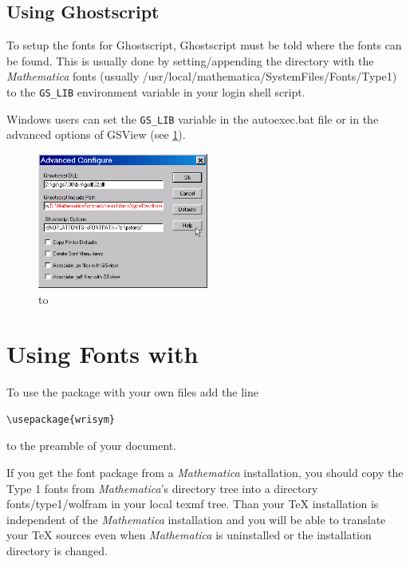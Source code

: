 \documentclass{article}
\newcommand{\Math}{\textit{Mathematica}\xspace}
\begin{document}
\subsection{Using Ghostscript}

To setup the fonts for Ghostscript, Ghostscript must be told where the
fonts can be found.  This is usually done by setting/appending the
directory with the \Math{} fonts (usually
\textsf{/usr/local/mathematica/SystemFiles/Fonts/Type1}) to the
\verb|GS_LIB| environment variable in your login shell script.

Windows users can set the \verb|GS_LIB| variable in the
\textsf{autoexec.bat} file or in the advanced options of
\textsf{GSView} (see \figurename{} \ref{Fig::GSPath}).

\begin{figure}
\includegraphics[width=0.5\textwidth]{GSPath}
\caption{\hbox to }\label{Fig::GSPath}
\end{figure}


\section{Using Fonts with \LaTeXe}
To use the package with your own files add the line
\begin{verbatim}
\usepackage{wrisym}
\end{verbatim}
%
to the preamble of your \LaTeXe{} document.

If you get the font package from a \Math{} installation, you
should copy the Type 1 fonts from \Math's directory tree into a
directory \textsf{fonts/type1/wolfram} in your local \textsf{texmf}
tree. Than your \TeX{} installation is independent of the \Math
installation and you will be able to translate your \TeX{} sources
even when \Math{} is uninstalled or the installation directory is
changed.
\end{document}

